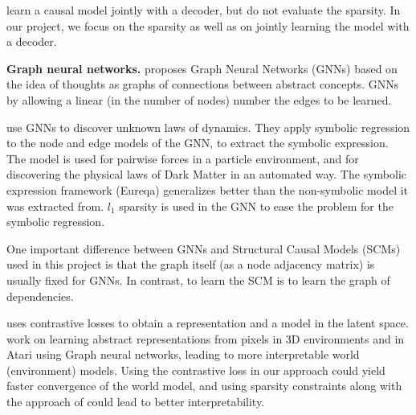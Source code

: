 \documentclass[a4paper,11pt,oneside]{report}
\begin{document}

 \cite{Johnson2016,Tang2019,Kurutach2021,Chalupka2015} learn a causal model jointly with a decoder, but do not evaluate the sparsity. In our project, we focus on the sparsity as well as on jointly learning the model with a decoder.

{\bf Graph neural networks.}
 \cite{Battaglia2016} proposes Graph Neural Networks \cite{Zhou2018} (GNNs) based on the idea of thoughts as graphs of connections between abstract concepts. \cite{Velickovic2020} GNNs by allowing a linear (in the number of nodes) number the edges to be learned.

 \cite{Cranmer2020} use GNNs to discover unknown laws of dynamics. They apply symbolic regression to the node and edge models of the GNN, to extract the symbolic expression. The model is used for pairwise forces in a particle environment, and for discovering the physical laws of Dark Matter in an automated way. The symbolic expression framework (Eureqa) generalizes better than the non-symbolic model it was extracted from. $l_1$ sparsity is used in the GNN to ease the problem for the symbolic regression.

One important difference between GNNs and Structural Causal Models (SCMs) used in this project is that the graph itself (as a node adjacency matrix) is usually fixed for GNNs. In contrast, to learn the SCM is to learn the graph of dependencies.


 \cite{VanDenOord2018} uses contrastive losses to obtain a representation and a model in the latent space.
 \cite{Kipf2020} work on learning abstract representations from pixels in 3D environments and in Atari using Graph neural networks, leading to more interpretable world (environment) models. Using the contrastive loss in our approach could yield faster convergence of the world model, and using sparsity constraints along with the approach of \cite{Kipf2020} could lead to better interpretability.
\end{document}
